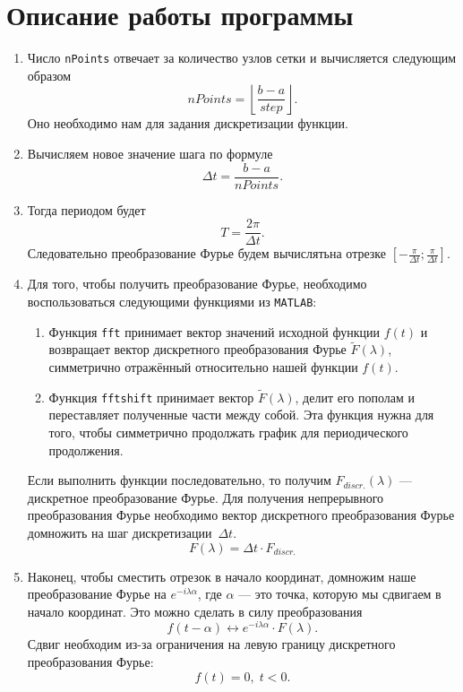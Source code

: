 \documentclass[a4paper, 11pt]{article}
\begin{document}
\section{Описание работы программы}
    \begin{enumerate}
        \item
            Число \texttt{nPoints} отвечает за количество узлов сетки и вычисляется следующим образом
            $$
                nPoints = \left \lfloor \frac{b-a}{step} \right \rfloor.        
            $$
            Оно необходимо нам для задания дискретизации функции.
        \item
            Вычисляем новое значение шага по формуле
            $$
                \Delta t = \frac{b-a}{nPoints}.
            $$
        \item
            Тогда периодом будет
            $$
                T = \frac{2\pi}{\Delta t}.            
            $$
            Следовательно преобразование Фурье будем вычислятьна отрезке $\left[ -\frac{\pi}{\Delta t}; \frac{\pi}{\Delta t} \right]$.
        \item
            Для того, чтобы получить преобразование Фурье, необходимо воспользоваться следующими функциями из \texttt{MATLAB}:
            \begin{enumerate}
                \item
                    Функция \texttt{fft} принимает вектор значений исходной функции $f(t)$ и возвращает вектор дискретного преобразования Фурье $\widetilde{F}(\lambda)$, симметрично отражённый относительно нашей функции $f(t)$.
                \item
                    Функция \texttt{fftshift} принимает вектор $\widetilde{F}(\lambda)$, делит его пополам и переставляет полученные части между собой. Эта функция нужна для того, чтобы симметрично продолжать график для периодического продолжения.
            \end{enumerate}
            Если выполнить функции последовательно, то получим $F_{discr.}(\lambda)$ --- дискретное преобразование Фурье. Для получения непрерывного преобразования Фурье необходимо вектор дискретного преобразования Фурье домножить на шаг дискретизации~$\Delta t$.
            $$
                F(\lambda) = \Delta t \cdot F_{discr.}            
            $$
        \item
            Наконец, чтобы сместить отрезок в начало координат, домножим наше преобразование Фурье на $e^{-i\lambda \alpha}$, где $\alpha$ --- это точка, которую мы сдвигаем в начало координат. Это можно сделать в силу преобразования
            $$
                f(t-\alpha) \longleftrightarrow e^{-i\lambda\alpha} \cdot F(\lambda).            
            $$
            Сдвиг необходим из-за ограничения на левую границу дискретного преобразования Фурье:
            $$
                f(t) = 0,\; t < 0.            
            $$
    \end{enumerate}
\clearpage
\end{document}
